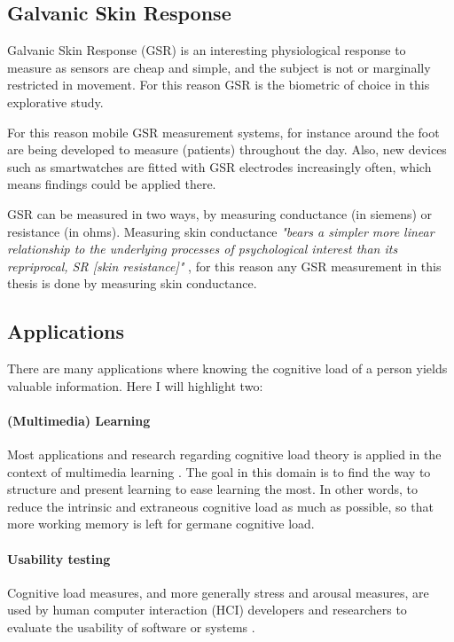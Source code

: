\documentclass[11pt,leqno,letterpaper]{report} %
\begin{document}
\subsection{Galvanic Skin Response}

Galvanic Skin Response (GSR) is an interesting physiological response to measure as sensors are cheap and simple, and the subject is not or marginally restricted in movement. For this reason GSR is the biometric of choice in this explorative study.

For this reason mobile GSR measurement systems, for instance around the foot \citep{Gravenhorst} are being developed to measure (patients) throughout the day. Also, new devices such as smartwatches are fitted with GSR electrodes increasingly often, which means findings could be applied there.

GSR can be measured in two ways, by measuring conductance (in siemens) or resistance (in ohms). Measuring skin conductance \textit{"bears a simpler more linear relationship to the underlying processes of psychological interest than its repriprocal, SR [skin resistance]"} \citep{lykken1971direct}, for this reason any GSR measurement in this thesis is done by measuring skin conductance.


\subsection{Applications}
There are many applications where knowing the cognitive load of a person yields valuable information. Here I will highlight two:

\paragraph{(Multimedia) Learning}
Most applications and research regarding cognitive load theory is applied in the context of multimedia learning \citep{brunken2003direct}. The goal in this domain is to find the way to structure and present learning to ease learning the most. In other words, to reduce the intrinsic and extraneous cognitive load as much as possible, so that more working memory is left for germane cognitive load.


\paragraph{Usability testing}
Cognitive load measures, and more generally stress and arousal measures, are used by human computer interaction (HCI) developers and researchers to evaluate the usability of software or systems \citep{Jacob2003} \citep{Schmutz2009}.
\end{document}
